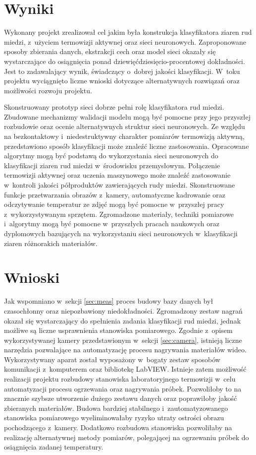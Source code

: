 \section{Wyniki}
Wykonany projekt zrealizował cel jakim była konstrukcja klasyfikatora ziaren
rud miedzi, z~użyciem termowizji aktywnej oraz sieci neuronowych.
Zaproponowane sposoby zbierania danych, ekstrakcji cech oraz model sieci
okazały się wystarczające do osiągnięcia ponad dziewięćdziesięcio-procentowej
dokładności.
Jest to zadawalający wynik, świadczący o~dobrej jakości klasyfikacji.
W~toku projektu wyciągnięto liczne wnioski dotyczące alternatywnych
rozwiązań oraz możliwości rozwoju projektu.

Skonstruowany prototyp sieci dobrze pełni rolę klasyfikatora rud miedzi.
Zbudowane mechanizmy walidacji modelu mogą być pomocne przy jego
przyszłej rozbudowie oraz ocenie alternatywnych struktur sieci neuronowych.
Ze względu na bezkontaktowy i~niedestruktywny charakter pomiarów
termowizją aktywną, przedstawiono sposób klasyfikacji może znaleźć liczne
zastosowania.
Opracowane algorytmy mogą być podstawą do wykorzystania sieci neuronowych
do klasyfikacji ziaren rud miedzi w~środowisku przemysłowym.
Połączenie termowizji aktywnej oraz uczenia maszynowego może znaleźć
zastosowanie w~kontroli jakości półproduktów zawierających rudy miedzi.
Skonstruowane funkcje przetwarzania obrazów z~kamery, automatyczne kadrowanie
oraz odczytywanie temperatur ze zdjęć mogą być pomocne w~przyszłej pracy
z~wykorzystywanym sprzętem.
Zgromadzone materiały, techniki pomiarowe i~algorytmy mogą być pomocne
w~przyszłych pracach naukowych oraz dyplomowych bazujących na wykorzystaniu
sieci neuronowych w~klasyfikacji ziaren różnorakich materiałów.

\section{Wnioski}
Jak wspomniano w~sekcji \ref{sec:meas} proces budowy bazy danych był
czasochłonny oraz niepozbawiony niedokładności.
Zgromadzony zestaw nagrań okazał się wystarczający do spełnienia zadania
klasyfikacji rud miedzi, jednak możliwe są liczne usprawnienia stanowiska
pomiarowego.
Zgodnie z~opisem wykorzystywanej kamery przedstawionym w~sekcji
\ref{sec:camera}, istnieją liczne narzędzia pozwalające na automatyzację
procesu nagrywania materiałów wideo.
Wykorzystywany aparat został wyposażony w~bogaty zestaw sposobów komunikacji
z~komputerem oraz bibliotekę LabVIEW.
Istnieje zatem możliwość realizacji projektu rozbudowy stanowiska
laboratoryjnego termowizji w~celu automatyzacji procesu ogrzewania oraz
nagrywania próbek.
Pozwoliłoby to na znacznie szybsze utworzenie dużego zestawu danych oraz
poprawiłoby jakość zbieranych materiałów.
Budowa bardziej stabilnego i~zautomatyzowanego stanowiska pomiarowego
wyeliminowałaby ryzyko utraty ostrości obrazu pochodzącego z~kamery.
Dodatkowo rozbudowa stanowiska pozwoliłaby na realizację alternatywnej
metody pomiarów, polegającej na ogrzewaniu próbek do osiągnięcia zadanej
temperatury.

